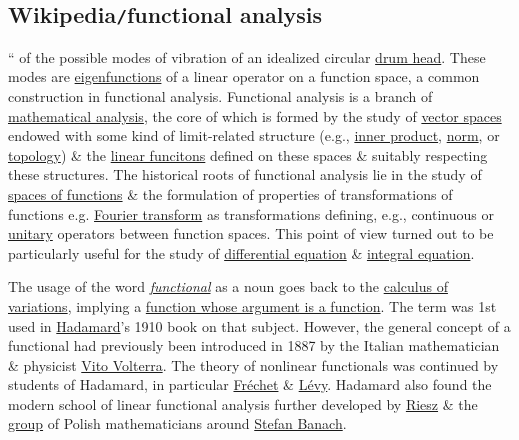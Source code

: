 \documentclass{article}
\begin{document}

\subsection{Wikipedia{\tt/}functional analysis}
``{ of the possible modes of vibration of an idealized circular \href{https://en.wikipedia.org/wiki/Drum_head}{drum head}. These modes are \href{https://en.wikipedia.org/wiki/Eigenfunction}{eigenfunctions} of a linear operator on a function space, a common construction in functional analysis.} {\sf Functional analysis} is a branch of \href{https://en.wikipedia.org/wiki/Mathematical_analysis}{mathematical analysis}, the core of which is formed by the study of \href{https://en.wikipedia.org/wiki/Vector_space}{vector spaces} endowed with some kind of limit-related structure (e.g., \href{https://en.wikipedia.org/wiki/Inner_product_space#Definition}{inner product}, \href{https://en.wikipedia.org/wiki/Norm_(mathematics)#Definition}{norm}, or \href{https://en.wikipedia.org/wiki/Topological_space#Definition}{topology}) \& the \href{https://en.wikipedia.org/wiki/Linear_transformation}{linear funcitons} defined on these spaces \& suitably respecting these structures. The historical roots of functional analysis lie in the study of \href{https://en.wikipedia.org/wiki/Function_space}{spaces of functions} \& the formulation of properties of transformations of functions e.g. \href{https://en.wikipedia.org/wiki/Fourier_transform}{Fourier transform} as transformations defining, e.g., continuous or \href{https://en.wikipedia.org/wiki/Unitary_operator}{unitary} operators between function spaces. This point of view turned out to be particularly useful for the study of \href{https://en.wikipedia.org/wiki/Differential_equations}{differential equation} \& \href{https://en.wikipedia.org/wiki/Integral_equations}{integral equation}.

The usage of the word \href{https://en.wikipedia.org/wiki/Functional_(mathematics)}{\it functional} as a noun goes back to the \href{https://en.wikipedia.org/wiki/Calculus_of_variations}{calculus of variations}, implying a \href{https://en.wikipedia.org/wiki/Higher-order_function}{function whose argument is a function}. The term was 1st used in \href{https://en.wikipedia.org/wiki/Jacques_Hadamard}{\sc Hadamard}'s 1910 book on that subject. However, the general concept of a functional had previously been introduced in 1887 by the Italian mathematician \& physicist \href{https://en.wikipedia.org/wiki/Vito_Volterra}{\sc Vito Volterra}. The theory of nonlinear functionals was continued by students of {\sc Hadamard}, in particular \href{https://en.wikipedia.org/wiki/Ren%C3%A9_Maurice_Fr%C3%A9chet}{\sc Fr\'echet} \& \href{https://en.wikipedia.org/wiki/Paul_L%C3%A9vy_(mathematician)}{\sc L\'evy}. {\sc Hadamard} also found the modern school of linear functional analysis further developed by \href{https://en.wikipedia.org/wiki/Frigyes_Riesz}{\sc Riesz} \& the \href{https://en.wikipedia.org/wiki/Lw%C3%B3w_School_of_Mathematics}{group} of Polish mathematicians around \href{https://en.wikipedia.org/wiki/Stefan_Banach}{\sc Stefan Banach}.
\end{document}
